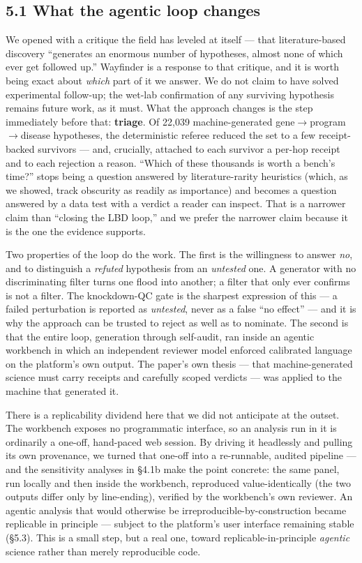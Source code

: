 \subsection*{5.1 What the agentic loop changes}\label{what-the-agentic-loop-changes}

We opened with a critique the field has leveled at itself --- that literature-based discovery ``generates an
enormous number of hypotheses, almost none of which ever get followed up.'' Wayfinder is a response to that
critique, and it is worth being exact about \emph{which} part of it we answer. We do not claim to have solved
experimental follow-up; the wet-lab confirmation of any surviving hypothesis remains future work, as it
must. What the approach changes is the step immediately before that: \textbf{triage}. Of 22,039
machine-generated gene$\rightarrow$program$\rightarrow$disease hypotheses, the deterministic referee reduced the set to a few
receipt-backed survivors --- and, crucially, attached to each survivor a per-hop receipt and to each
rejection a reason. ``Which of these thousands is worth a bench's time?'' stops being a question answered by
literature-rarity heuristics (which, as we showed, track obscurity as readily as importance) and becomes a
question answered by a data test with a verdict a reader can inspect. That is a narrower claim than
``closing the LBD loop,'' and we prefer the narrower claim because it is the one the evidence supports.

Two properties of the loop do the work. The first is the willingness to answer \emph{no}, and to distinguish a
\emph{refuted} hypothesis from an \emph{untested} one. A generator with no discriminating filter turns one flood into
another; a filter that only ever confirms is not a filter. The knockdown-QC gate is the sharpest expression
of this --- a failed perturbation is reported as \emph{untested}, never as a false ``no effect'' --- and it is why the
approach can be trusted to reject as well as to nominate. The second is that the entire loop, generation
through self-audit, ran inside an agentic workbench in which an independent reviewer model enforced
calibrated language on the platform's own output. The paper's own thesis --- that machine-generated science
must carry receipts and carefully scoped verdicts --- was applied to the machine that generated it.

There is a replicability dividend here that we did not anticipate at the outset. The workbench exposes no
programmatic interface, so an analysis run in it is ordinarily a one-off, hand-paced web session. By driving
it headlessly and pulling its own provenance, we turned that one-off into a re-runnable, audited pipeline ---
and the sensitivity analyses in \S{}4.1b make the point concrete: the same panel, run locally and then inside
the workbench, reproduced value-identically (the two outputs differ only by line-ending), verified by the workbench's own reviewer. An agentic analysis that
would otherwise be irreproducible-by-construction became replicable in principle --- subject to the
platform's user interface remaining stable (\S{}5.3). This is a small step, but a real one, toward
replicable-in-principle \emph{agentic} science rather than merely reproducible code.

